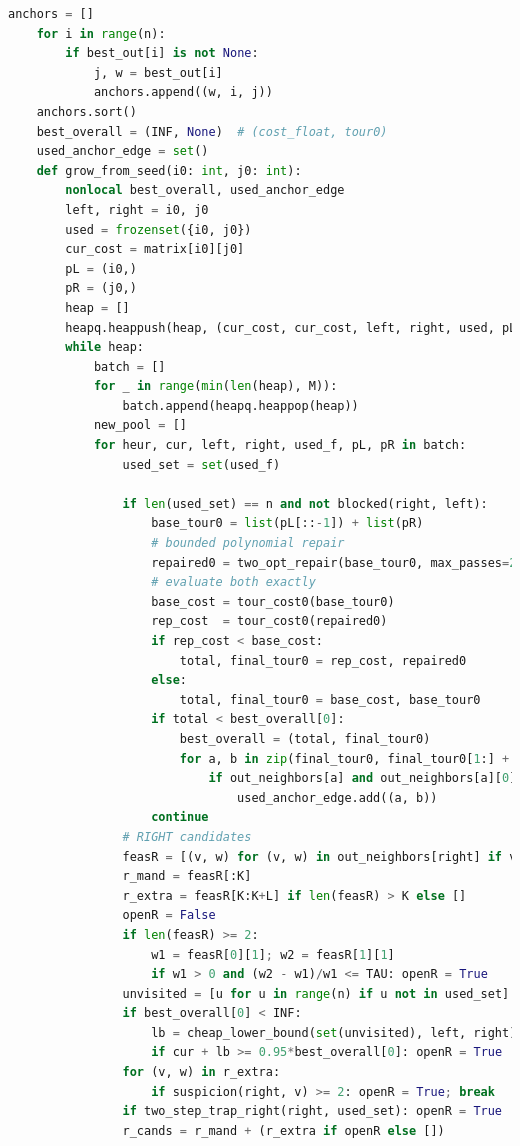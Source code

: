 \documentclass[sn-mathphys]{article}
\theoremstyle{thmstyleone}%
\theoremstyle{thmstyletwo}%
\theoremstyle{thmstylethree}%
\begin{document}
\begin{appendices}
\begin{lstlisting}[language=Python]
    anchors = []
    for i in range(n):
        if best_out[i] is not None:
            j, w = best_out[i]
            anchors.append((w, i, j))
    anchors.sort()
    best_overall = (INF, None)  # (cost_float, tour0)
    used_anchor_edge = set()
    def grow_from_seed(i0: int, j0: int):
        nonlocal best_overall, used_anchor_edge
        left, right = i0, j0
        used = frozenset({i0, j0})
        cur_cost = matrix[i0][j0]
        pL = (i0,)
        pR = (j0,)
        heap = []
        heapq.heappush(heap, (cur_cost, cur_cost, left, right, used, pL, pR))
        while heap:
            batch = []
            for _ in range(min(len(heap), M)):
                batch.append(heapq.heappop(heap))
            new_pool = []
            for heur, cur, left, right, used_f, pL, pR in batch:
                used_set = set(used_f)

                if len(used_set) == n and not blocked(right, left):
                    base_tour0 = list(pL[::-1]) + list(pR)
                    # bounded polynomial repair
                    repaired0 = two_opt_repair(base_tour0, max_passes=2)
                    # evaluate both exactly
                    base_cost = tour_cost0(base_tour0)
                    rep_cost  = tour_cost0(repaired0)
                    if rep_cost < base_cost:
                        total, final_tour0 = rep_cost, repaired0
                    else:
                        total, final_tour0 = base_cost, base_tour0
                    if total < best_overall[0]:
                        best_overall = (total, final_tour0)
                        for a, b in zip(final_tour0, final_tour0[1:] + [final_tour0[0]]):
                            if out_neighbors[a] and out_neighbors[a][0][0] == b:
                                used_anchor_edge.add((a, b))
                    continue
                # RIGHT candidates
                feasR = [(v, w) for (v, w) in out_neighbors[right] if v not in used_set]
                r_mand = feasR[:K]
                r_extra = feasR[K:K+L] if len(feasR) > K else []
                openR = False
                if len(feasR) >= 2:
                    w1 = feasR[0][1]; w2 = feasR[1][1]
                    if w1 > 0 and (w2 - w1)/w1 <= TAU: openR = True
                unvisited = [u for u in range(n) if u not in used_set]
                if best_overall[0] < INF:
                    lb = cheap_lower_bound(set(unvisited), left, right)
                    if cur + lb >= 0.95*best_overall[0]: openR = True
                for (v, w) in r_extra:
                    if suspicion(right, v) >= 2: openR = True; break
                if two_step_trap_right(right, used_set): openR = True
                r_cands = r_mand + (r_extra if openR else [])


\end{lstlisting}
\end{appendices}
\end{document}
